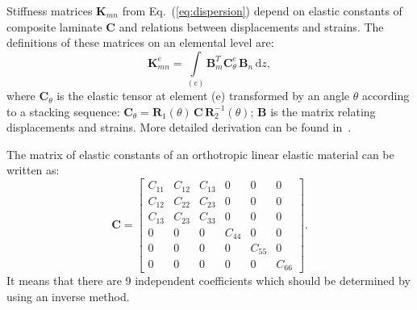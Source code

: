 \documentclass[preprint,12pt]{elsarticle}
\newcommand{\matr}[1]{\mathbf{#1}} %
\newcommand{\ud}{\mathrm{d}}
\begin{document}
Stiffness matrices $\matr{K}_{mn}$ from Eq.~(\ref{eq:dispersion}) depend on elastic constants of composite laminate $\matr{C}$ and relations between displacements and strains. 
The definitions of these matrices on an elemental level are:
\begin{equation}
	\matr{K}_{mn}^e= \int \limits_{(e)} \matr{B}_m^{T} \matr{C}_{\theta}^e \, \matr{B}_n\, \ud z, 
	\label{eq:stiffness_matrix_e}
\end{equation}
where \(\matr{C}_{\theta}\) is the elastic tensor at element (e) transformed by an angle \(\theta\) according to a stacking sequence: $ \matr{C}_{\theta}= \matr{R}_1(\theta) \,\matr{C} \,\matr{R}_2^{-1}(\theta)$; \(\matr{B}\) is the matrix relating displacements and strains.
More detailed derivation can be found in~\cite{Kudela2020}. 

The matrix of elastic constants of an orthotropic linear elastic material can be written as:
\begin{equation}
	\matr{C} = \left[\begin{array}{cccccc} C_{11} & C_{12}& C_{13} & 0&0&0\\[2pt]
		C_{12}& C_{22} & C_{23}& 0&0&0\\[2pt]
		C_{13}&C_{23}&C_{33}&0&0&0\\[2pt]
		0& 0 &0&C_{44}& 0&0\\[2pt]
		0&0&0&0&C_{55}&0\\[2pt]
		0&0&0&0&0&C_{66}
	\end{array}\right]. 
	\label{eq:elastic_constatns}
\end{equation} 
It means that there are 9 independent coefficients which should be determined by using an inverse method. 
	
\end{document}
